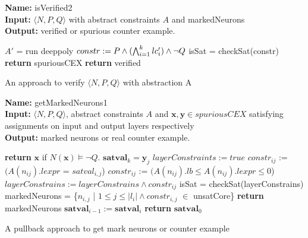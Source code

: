 \begin{algorithm}[t]
  \textbf{Name: } isVerified2 \\
  \textbf{Input: } $\langle N,P,Q \rangle$ with abstract constraints $A$ and markedNeurons \\
  \textbf{Output: } verified or spurious counter example. 
  \begin{algorithmic}[1]
      \State $A'$ = run deeppoly
      \State $constr := P \land (\bigwedge_{i=1}^k lc'_i) \land \neg Q$ 
        \State isSat = checkSat(constr)
          \State \textbf{return} spuriousCEX
        \EndIf
    \EndFor
    \State \textbf{return} verified
  \end{algorithmic}
  \caption{An approach to verify $\langle N,P,Q \rangle$ with abstraction A}
  \label{algo:verif2}
\end{algorithm}



\begin{algorithm}[t]
  \textbf{Name: } getMarkedNeurons1 \\
  \textbf{Input: } $\langle N,P,Q \rangle$, abstract constraints $A$ and $\boldsymbol{x}, \boldsymbol{y} \in spuriousCEX$ satisfying assignments on input and output layers respectively\\
  \textbf{Output: } marked neurons or real counter example. 
  \begin{algorithmic}[1]
    \State \textbf{return} $\boldsymbol{x}$ if $N(\boldsymbol{x}) \models \neg Q$. 
   \State $\boldsymbol{satval}_k = \boldsymbol{y}_j$
        \State $layerConstraints := true$
            \State $constr_{ij}$ := $(A(n_{ij}).lexpr$ = $satval_{i,j}$) 
          \Else
            \State $constr_{ij}$ := $(A(n_{ij}).lb \leq A(n_{ij}).lexpr \leq 0$)
          \EndIf
          \State $layerConstrains := layerConstrains \land constr_{ij}$
        \EndFor
        \State isSat = checkSat(layerConstrains)
          \State markedNeurons = \{$n_{i,j}$ | $1 \leq j\leq |l_i| \land constr_{i,j}$ $\in$ unsatCore\}
          \State \textbf{return } markedNeurons
        \EndIf
      \Else {}
        \State $\boldsymbol{satval}_{i-1} := \boldsymbol{satval}_i$
      \EndIf
   \EndFor
    \State \textbf{return} $\boldsymbol{satval}_0$ 
  \end{algorithmic}
  \caption{A pullback approach to get mark neurons or counter example}
  \label{algo:refine1}
\end{algorithm}


